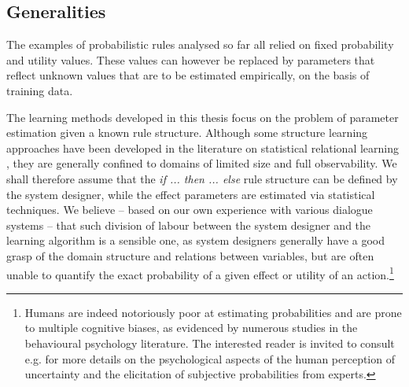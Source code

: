 \subsection{Generalities}

The examples of probabilistic rules analysed so far all relied on fixed probability and utility values. These values can however be replaced by parameters that reflect unknown values that are to be estimated empirically, on the basis of training data. 

The learning methods developed in this thesis focus on the problem of parameter estimation given a known rule structure.  Although some structure learning approaches have been developed in the literature on statistical relational learning \citep[see e.g. ][]{PasulaZK07,Kok:2009}, they are generally confined to domains of limited size and full observability. We shall therefore assume that the \textit{if ... then ... else} rule structure can be defined by the system designer, while the effect parameters are estimated via statistical techniques. We believe -- based on our own experience with various dialogue systems --  that such division of labour between the system designer and the learning algorithm is a sensible one, as system designers generally have a good grasp of the domain structure and relations between variables, but are often unable to quantify the exact probability of a given effect or utility of an action.\footnote{Humans are indeed notoriously poor at estimating probabilities and are prone to multiple cognitive biases, as evidenced by numerous studies in the behavioural psychology literature.  The interested reader is invited to consult e.g. \cite{KahnemanSlovicTversky81,morganhenrion} for more details on the psychological aspects of the human perception of uncertainty and the elicitation of subjective probabilities from experts.}

